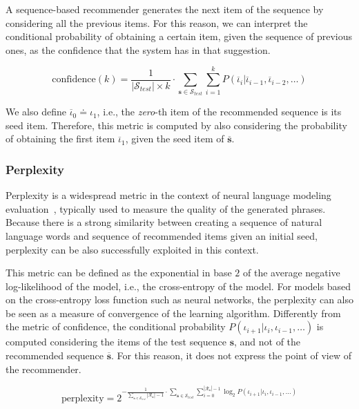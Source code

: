 A sequence-based recommender generates the next item of the sequence by considering all the previous items. For this reason, we can interpret the conditional probability of obtaining a certain item, given the sequence of previous ones, as the confidence that the system has in that suggestion.

\begin{equation}
\mathrm{confidence}(k) = \frac{1}{|\mathcal{S}_{test}| \times k} \cdot \sum_{\mathbf{s} \in \mathcal{S}_{test}} \sum_{i = 1}^k P(\overline{\iota}_i | \overline{\iota}_{i - 1}, \overline{\iota}_{i - 2}, \dotsc)
\end{equation}

We also define $\overline{\iota}_0 \doteq \iota_1$, i.e., the \textit{zero}-th item of the recommended sequence is its seed item. Therefore, this metric is computed by also considering the probability of obtaining the first item $\overline{\iota}_1$, given the seed item of $\mathbf{\overline{s}}$.

\subsubsection{Perplexity}
\label{seq:sec:perplexity}

Perplexity is a widespread metric in the context of neural language modeling evaluation~\cite{Bengio2003}, typically used to measure the quality of the generated phrases. Because there is a strong similarity between creating a sequence of natural language words and sequence of recommended items given an initial seed, perplexity can be also successfully exploited in this context.

This metric can be defined as the exponential in base $2$ of the average negative log-likelihood of the model, i.e., the cross-entropy of the model. For models based on the cross-entropy loss function such as neural networks, the perplexity can also be seen as a measure of convergence of the learning algorithm. Differently from the metric of confidence, the conditional probability $P(\iota_{i + 1} | \iota_i, \iota_{i - 1}, \dotsc)$ is computed considering the items of the test sequence $\mathbf{s}$, and not of the recommended sequence $\mathbf{\overline{s}}$. For this reason, it does not express the point of view of the recommender.

\begin{equation}
\mathrm{perplexity} = 2^{-\frac{1}{\sum_{\mathbf{s} \in \mathcal{S}_{test}} |\mathcal{R}_\mathbf{s}| - 1} \cdot \sum_{\mathbf{s} \in \mathcal{S}_{test}} \sum_{i = 0}^{|\mathcal{R}_\mathbf{s}| - 1} \log_2 P(\iota_{i + 1} | \iota_i, \iota_{i - 1}, \dotsc)}
\end{equation}

